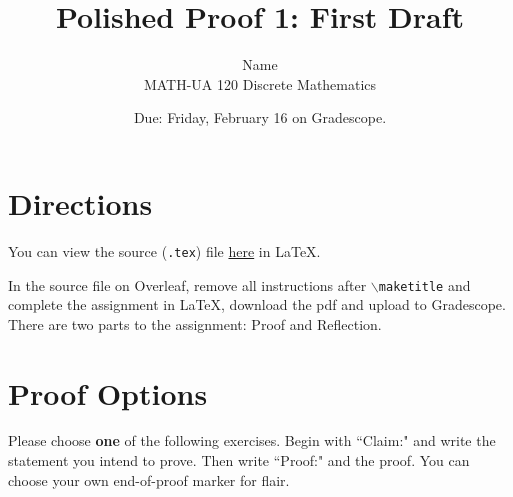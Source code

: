 \documentclass{article}
\title{Polished Proof 1: First Draft}
\author{%
	Name
	\\
	MATH-UA 120 Discrete Mathematics
}
\date{Due: Friday, February 16 on Gradescope.}
\theoremstyle{definition}
\begin{document}
    \maketitle
	
\section*{Directions}
    You can view the source (\texttt{.tex}) file \href{}{here} in \LaTeX.
    
    In the source file on Overleaf, remove all instructions after \texttt{$\backslash$maketitle} and complete the assignment in \LaTeX, 
    download the pdf and upload to Gradescope. There are two parts to the assignment: Proof and Reflection.

\section*{Proof Options}
    Please choose \textbf{one} of the following exercises. Begin with ``Claim:" and write the statement you intend to prove. 
    Then write ``Proof:" and the proof. You can choose your own end-of-proof marker for flair.
\end{document}
